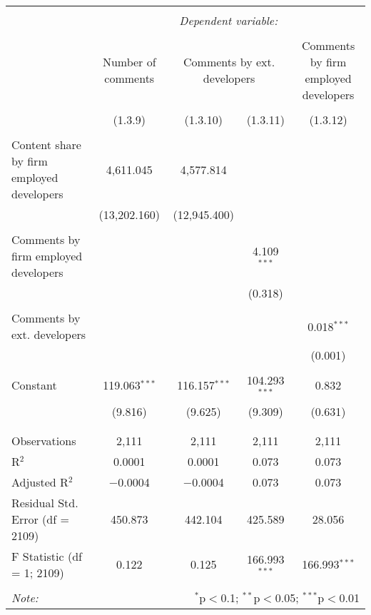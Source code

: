 
\begin{tabular}{@{\extracolsep{5pt}}lcccc}
\\[-1.8ex]\hline
\hline \\[-1.8ex]
 & \multicolumn{4}{c}{\textit{Dependent variable:}} \\
\cline{2-5}
\\[-1.8ex] & Number of comments & \multicolumn{2}{c}{Comments by ext. developers} & Comments by firm employed developers \\
\\[-1.8ex] & (1.3.9) & (1.3.10) & (1.3.11) & (1.3.12)\\
\hline \\[-1.8ex]
 Content share by firm employed developers & 4,611.045 & 4,577.814 &  &  \\
  & (13,202.160) & (12,945.400) &  &  \\
  & & & & \\
 Comments by firm employed developers &  &  & 4.109$^{***}$ &  \\
  &  &  & (0.318) &  \\
  & & & & \\
 Comments by ext. developers &  &  &  & 0.018$^{***}$ \\
  &  &  &  & (0.001) \\
  & & & & \\
 Constant & 119.063$^{***}$ & 116.157$^{***}$ & 104.293$^{***}$ & 0.832 \\
  & (9.816) & (9.625) & (9.309) & (0.631) \\
  & & & & \\
\hline \\[-1.8ex]
Observations & 2,111 & 2,111 & 2,111 & 2,111 \\
R$^{2}$ & 0.0001 & 0.0001 & 0.073 & 0.073 \\
Adjusted R$^{2}$ & $-$0.0004 & $-$0.0004 & 0.073 & 0.073 \\
Residual Std. Error (df = 2109) & 450.873 & 442.104 & 425.589 & 28.056 \\
F Statistic (df = 1; 2109) & 0.122 & 0.125 & 166.993$^{***}$ & 166.993$^{***}$ \\
\hline
\hline \\[-1.8ex]
\textit{Note:}  & \multicolumn{4}{r}{$^{*}$p$<$0.1; $^{**}$p$<$0.05; $^{***}$p$<$0.01} \\
\end{tabular}
